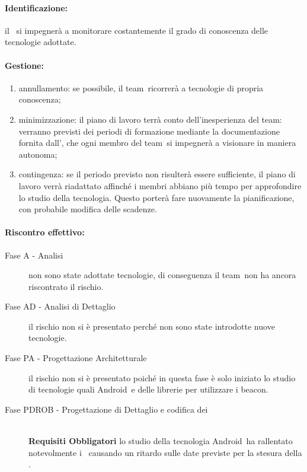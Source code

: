 \documentclass[../PianoProgetto.tex]{subfiles}
\begin{document}
		
	
	\paragraph*{Identificazione:} il \responsabilediprogetto\ si impegnerà a monitorare costantemente il grado di conoscenza delle tecnologie adottate.	
	
	\paragraph*{Gestione:}
	\begin{enumerate}
		\item annullamento: se possibile, il team\g\ ricorrerà a tecnologie di propria conoscenza;
		\item minimizzazione: il piano di lavoro terrà conto dell'inesperienza del team\g : verranno previsti dei periodi di formazione mediante la documentazione fornita dall'\amministratore , che ogni membro del team\g\ si impegnerà a visionare in maniera autonoma;
		\item contingenza: se il periodo previsto non risulterà essere sufficiente, il piano di lavoro verrà riadattato affinché i membri abbiano più tempo per approfondire lo studio della tecnologia. Questo porterà fare nuovamente la pianificazione, con probabile modifica delle scadenze.
	\end{enumerate}
	
	
	\paragraph*{Riscontro effettivo:} 
		\begin{description}
			\item[Fase A - Analisi] non sono state adottate tecnologie, di conseguenza il team\g\ non ha ancora riscontrato il rischio.
			\item[Fase AD - Analisi di Dettaglio] il rischio non si è presentato perché non sono state introdotte nuove tecnologie.
			\item[Fase PA - Progettazione Architetturale] il rischio non si è presentato poiché in questa fase è solo iniziato lo studio di tecnologie quali Android\g\ e delle librerie per utilizzare i beacon\g.
			\item[Fase PDROB - Progettazione di Dettaglio e codifica dei]  \ \\
					 \textbf{Requisiti Obbligatori} lo studio della tecnologia Android\g\ ha rallentato notevolmente i \progettisti\, causando un ritardo sulle date previste per la stesura della .
		\end{description}
\end{document}
